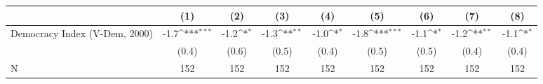 {
\def\sym#1{\ifmmode^{#1}\else\(^{#1}\)\fi}
\begin{tabular}{l*{8}{c}}
\hline\hline
                    &\multicolumn{1}{c}{(1)}         &\multicolumn{1}{c}{(2)}         &\multicolumn{1}{c}{(3)}         &\multicolumn{1}{c}{(4)}         &\multicolumn{1}{c}{(5)}         &\multicolumn{1}{c}{(6)}         &\multicolumn{1}{c}{(7)}         &\multicolumn{1}{c}{(8)}         \\
\hline
Democracy Index (V-Dem, 2000)&        -1.7\sym{***}&        -1.2\sym{*}  &        -1.3\sym{**} &        -1.0\sym{*}  &        -1.8\sym{***}&        -1.1\sym{*}  &        -1.2\sym{**} &        -1.1\sym{*}  \\
                    &       (0.4)         &       (0.6)         &       (0.5)         &       (0.4)         &       (0.5)         &       (0.5)         &       (0.4)         &       (0.4)         \\
\hline
N                   &         152         &         152         &         152         &         152         &         152         &         152         &         152         &         152         \\
\hline\hline
\end{tabular}
}
